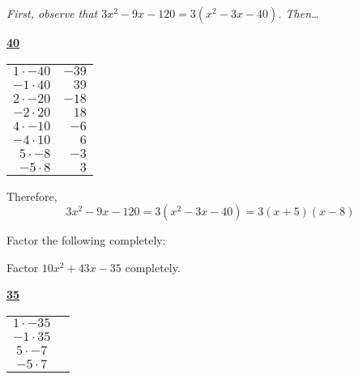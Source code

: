\documentclass[12pt,letterpaper]{exam}
\begin{document}
\begin{questions}
{\itshape First, observe that $3x^2 - 9x - 120= 3(x^2 - 3x - 40)$. Then\dots
	\begin{table}[!ht]
	\centering
	\underline{\bfseries 40} \pvspace{0.2cm}
	\begin{tabular}{rr}
	$1 \cdot -40$ & $-39$ \\
	$-1 \cdot 40$ & $39$ \\
	$2 \cdot -20$ & $-18$ \\
	$-2 \cdot 20$ & $18$ \\
	$4 \cdot -10$ & $-6$ \\
	$-4 \cdot 10$ & $6$ \\ \hline
	\multicolumn{1}{|r}{$5 \cdot -8$} & \multicolumn{1}{r|}{$-3$} \\ \hline
	$-5 \cdot 8$ & $3$ 
	\end{tabular}
	\end{table}

Therefore,
	\[
	3x^2 - 9x - 120= 3(x^2 - 3x - 40)= 3(x + 5)(x - 8)
	\] 
}



\newpage
\question Factor the following completely: \pspace




\newpage
\question[10] Factor $10x^2 + 43x - 35$ completely. \pspace

{\itshape
	\begin{table}[!ht]
	\centering
	\underline{\bfseries 35} \pvspace{0.2cm}
	\begin{tabular}{cc}
	$1 \cdot -35$ \\
	$-1 \cdot 35$ \\
	$5 \cdot -7$ \\
	$-5 \cdot 7$
	\end{tabular}
	\end{table}

}
\end{questions}
\end{document}
